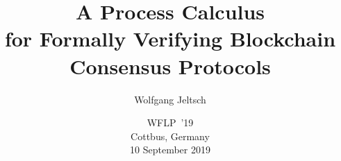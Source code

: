\documentclass{beamer}
\begin{document}
\title[A Process Calculus for Blockchains]{%
    A Process Calculus\\
    for Formally Verifying Blockchain Consensus Protocols%
}
\author{Wolfgang Jeltsch}
\date[WFLP~’19]{%
    WFLP~’19\bigskip\\
    \scriptsize Cottbus, Germany\\10 September 2019%
}

\begin{frame}

\titlepage

\end{frame}


\end{document}
